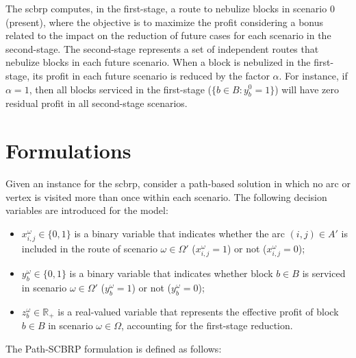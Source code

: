 The \gls{scbrp} computes, in the first-stage, a route to nebulize blocks in
scenario $0$ (present), where the objective is to maximize the profit
considering a bonus related to the impact on the reduction of future cases for
each scenario in the second-stage. The second-stage represents a set of
independent routes that nebulize blocks in each future scenario. When a block is
nebulized in the first-stage, its profit in each future scenario is reduced by
the factor $\alpha$. For instance, if $\alpha = 1$, then all blocks serviced in
the first-stage ($\{b \in B : y_{b}^{0} = 1\}$) will have zero residual profit
in all second-stage scenarios.

\section{Formulations}\label{sec:stochastic-formulations}

Given an instance for the \gls{scbrp}, consider a path-based solution in which
no arc or vertex is visited more than once within each scenario. The following
decision variables are introduced for the model:

\begin{itemize}
	\item $x_{i,j}^{\omega} \in \{0, 1\}$ is a binary variable that indicates
	      whether the arc $(i, j) \in A'$ is included in the route of scenario
	      $\omega \in \Omega'$ ($x_{i,j}^{\omega} = 1$) or not
	      ($x_{i,j}^{\omega} = 0$);
	\item $y_{b}^{\omega} \in \{0, 1\}$ is a binary variable that indicates
	      whether block $b \in B$ is serviced in scenario $\omega \in \Omega'$
	      ($y_{b}^{\omega} = 1$) or not ($y_{b}^{\omega} = 0$);
	\item $z_{b}^{\omega} \in \mathbb{R}_{+}$ is a real-valued variable that
	      represents the effective profit of block $b \in B$ in scenario
	      $\omega \in \Omega$, accounting for the first-stage reduction.
\end{itemize}

The Path-SCBRP formulation is defined as follows:
\allowdisplaybreaks

